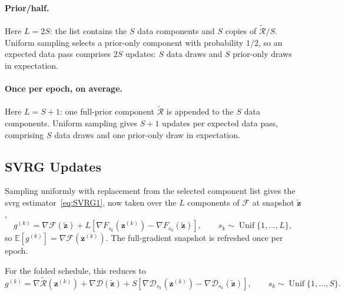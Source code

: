 \paragraph{Prior/half.}
Here $L=2S$: the list contains the $S$ data components and $S$ copies of $\widetilde{\mathcal R}/S$. Uniform sampling selects a prior-only component with probability $1/2$, so an expected data pass comprises $2S$ updates: $S$ data draws and $S$ prior-only draws in expectation.

\paragraph{Once per epoch, on average.}
Here $L=S+1$: one full-prior component $\widetilde{\mathcal R}$ is appended to the $S$ data components. Uniform sampling gives $S+1$ updates per expected data pass, comprising $S$ data draws and one prior-only draw in expectation.

\subsection{SVRG Updates}
\label{subsec:optimisation_svrg_updates}

Sampling uniformly with replacement from the selected component list gives the \gls{svrg} estimator~\eqref{eq:SVRG1}, now taken over the $L$ components of $\mathcal{F}$ at snapshot $\widetilde{\bm z}$,
\[
    g^{(k)}
    =
    \nabla\mathcal{F}(\widetilde{\bm z})
    +L\!\left[
        \nabla F_{s_k}(\bm z^{(k)})
        -\nabla F_{s_k}(\widetilde{\bm z})
    \right],
    \qquad s_k\sim\operatorname{Unif}\{1,\ldots,L\},
\]
so $\mathbb E[g^{(k)}]=\nabla\mathcal{F}(\bm z^{(k)})$. The full-gradient snapshot is refreshed once per epoch.

For the folded schedule, this reduces to
\begin{equation}
    g^{(k)} = \nabla\widetilde{\mathcal R}(\bm z^{(k)})
    + \nabla\mathcal D(\widetilde{\bm z})
    + S\!\left[
        \nabla\mathcal D_{s_k}(\bm z^{(k)})
        -\nabla\mathcal D_{s_k}(\widetilde{\bm z})
    \right],
    \qquad s_k\sim\operatorname{Unif}\{1,\ldots,S\}.
    \label{eq:svrg_estimator_general}
\end{equation}

